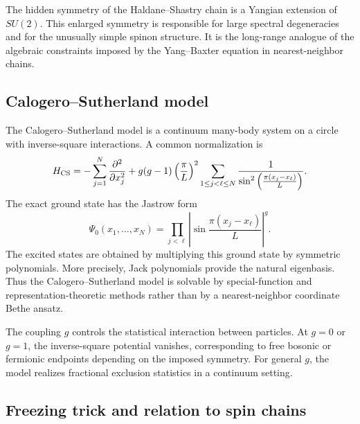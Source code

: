 \begin{remark}
The hidden symmetry of the Haldane--Shastry chain is a Yangian extension of
$SU(2)$.  This enlarged symmetry is responsible for large spectral degeneracies
and for the unusually simple spinon structure.  It is the long-range analogue of
the algebraic constraints imposed by the Yang--Baxter equation in nearest-neighbor
chains.
\end{remark}

\subsection{Calogero--Sutherland model}
\label{subsec:further-calogero-sutherland}

The Calogero--Sutherland model is a continuum many-body system on a circle with
inverse-square interactions.  A common normalization is
\begin{equation}
\label{eq:further-calogero-sutherland-hamiltonian}
    H_{\rm CS}
    =
    -\sum_{j=1}^{N}\frac{\partial^2}{\partial x_j^2}
    +
    g(g-1)\left(\frac{\pi}{L}\right)^2
    \sum_{1\leq j<\ell\leq N}
    \frac{1}
         {\sin^2\left(\frac{\pi(x_j-x_\ell)}{L}\right)} .
\end{equation}
The exact ground state has the Jastrow form
\begin{equation}
\label{eq:further-cs-ground-state}
    \Psi_0(x_1,\ldots,x_N)
    =
    \prod_{j<\ell}
    \left|
        \sin\frac{\pi(x_j-x_\ell)}{L}
    \right|^{g}.
\end{equation}
The excited states are obtained by multiplying this ground state by symmetric
polynomials.  More precisely, Jack polynomials provide the natural eigenbasis.
Thus the Calogero--Sutherland model is solvable by special-function and
representation-theoretic methods rather than by a nearest-neighbor coordinate
Bethe ansatz.

The coupling $g$ controls the statistical interaction between particles.  At
$g=0$ or $g=1$, the inverse-square potential vanishes, corresponding to free
bosonic or fermionic endpoints depending on the imposed symmetry.  For general
$g$, the model realizes fractional exclusion statistics in a continuum setting.

\subsection{Freezing trick and relation to spin chains}
\label{subsec:further-freezing-trick}

